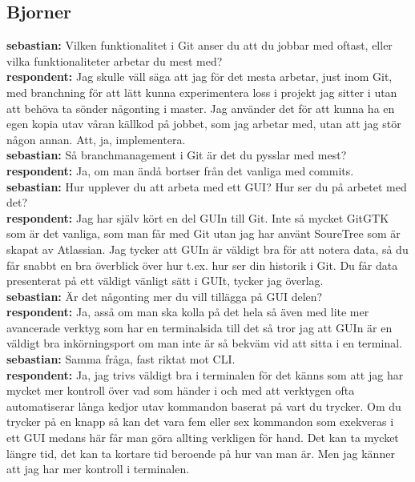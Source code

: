 \documentclass[a4paper,oneside]{bth} %
\begin{document}
		
		
		
		\subsection{Bjorner}
		\textbf{sebastian:} Vilken funktionalitet i Git anser du att du jobbar med oftast, eller vilka funktionaliteter arbetar du mest med?
		\\\textbf{respondent:} Jag skulle väll säga att jag för det mesta arbetar, just inom Git, med branchning för att lätt kunna experimentera loss i projekt jag sitter i utan att behöva ta sönder någonting i master.
		Jag använder det för att kunna ha en egen kopia utav våran källkod på jobbet, som jag arbetar med, utan att jag stör någon annan. Att, ja, implementera.
		\\\textbf{sebastian:} Så branchmanagement i Git är det du pysslar med mest?
		\\\textbf{respondent:} Ja, om man ändå bortser från det vanliga med commits.
		\\\textbf{sebastian:} Hur upplever du att arbeta med ett GUI? Hur ser du på arbetet med det?
		\\\textbf{respondent:} Jag har själv kört en del GUIn till Git. Inte så mycket GitGTK som är det vanliga, som man får med Git utan jag har använt SoureTree som är skapat av Atlassian.
		Jag tycker att GUIn är väldigt bra för att notera data, så du får snabbt en bra överblick över hur t.ex. hur ser din historik i Git. Du får data presenterat på ett väldigt vänligt sätt i GUIt, tycker jag överlag.
		\\\textbf{sebastian:} Är det någonting mer du vill tillägga på GUI delen?
		\\\textbf{respondent:} Ja, asså om man ska kolla på det hela så även med lite mer avancerade verktyg som har en terminalsida till det så tror jag att GUIn är en väldigt bra inkörningsport om man inte är så bekväm vid att sitta i en terminal.
		\\\textbf{sebastian:} Samma fråga, fast riktat mot CLI.
		\\\textbf{respondent:} Ja, jag trivs väldigt bra i terminalen för det känns som att jag har mycket mer kontroll över vad som händer i och med att verktygen ofta automatiserar långa kedjor utav kommandon baserat på vart du trycker. Om du trycker på en knapp så kan det vara fem eller sex kommandon som exekveras i ett GUI medans här får man göra allting verkligen för hand.
		Det kan ta mycket längre tid, det kan ta kortare tid beroende på hur van man är. Men jag känner att jag har mer kontroll i terminalen.
\end{document}
